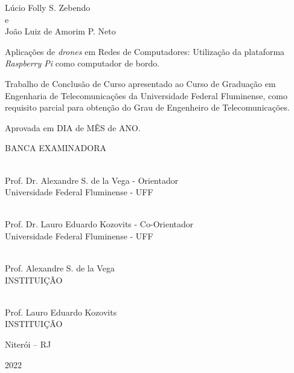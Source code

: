 \documentclass[12pt,a4paper,oneside]{book}
\begin{document}
\vspace*{\fill}

\clearpage




\begin{center}

Lúcio Folly S. Zebendo\\e\\João Luiz de Amorim P. Neto

\vspace{1.0cm}

Aplica\c{c}\~{o}es de \textit{drones} em Redes de Computadores: Utilização da plataforma \textit{Raspberry Pi} como computador de bordo.

\vspace{1.0cm}

\begin{flushright}
\begin{minipage}{0.55\textwidth}
%
Trabalho de Conclusão de Curso 
apresentado ao Curso de Graduação em Engenharia de Telecomunicações 
da Universidade Federal Fluminense, 
como requisito parcial para obtenção 
do Grau de Engenheiro de Telecomunicações. 
%
\end{minipage}
\end{flushright}

\vfill

\begin{flushleft}

Aprovada em DIA de MÊS de ANO.

\end{flushleft}

\vfill

BANCA EXAMINADORA

\vfill

\hrulefill \\
Prof. Dr. Alexandre S. de la Vega - Orientador\\
Universidade Federal Fluminense - UFF

\vfill

\hrulefill \\
Prof. Dr. Lauro Eduardo Kozovits - Co-Orientador\\
Universidade Federal Fluminense - UFF

\vfill

\hrulefill \\
Prof. Alexandre S. de la Vega\\
INSTITUIÇÃO

\vfill

\hrulefill \\
Prof. Lauro Eduardo Kozovits\\
INSTITUIÇÃO

\vfill

Niterói -- RJ

2022

\end{center}
\end{document}
